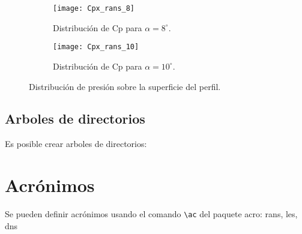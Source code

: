 \begin{figure}[ht!]
\centering
\begin{subfigure}{0.5\textwidth}
  \centering
  \texttt{[image: Cpx\_rans\_8]}
  \caption{Distribución de Cp para $\alpha=8^\circ$.}
  \label{fig:Cpx_rans_8}
\end{subfigure}%
\begin{subfigure}{0.5\textwidth}
  \centering
  \texttt{[image: Cpx\_rans\_10]}
  \caption{Distribución de Cp para $\alpha=10^\circ$.}
  \label{fig:Cpx_rans_10}
\end{subfigure}
\caption{Distribución de presión sobre la superficie del perfil.}
\label{fig:Cpx_rans_a2}
\end{figure}    

\clearpage
\subsection{Arboles de directorios}

Es posible crear arboles de directorios:


\section{Acrónimos}


Se pueden definir acrónimos usando el comando \verb'\ac' del paquete acro: \ac{rans}, \ac{les}, \ac{dns}

